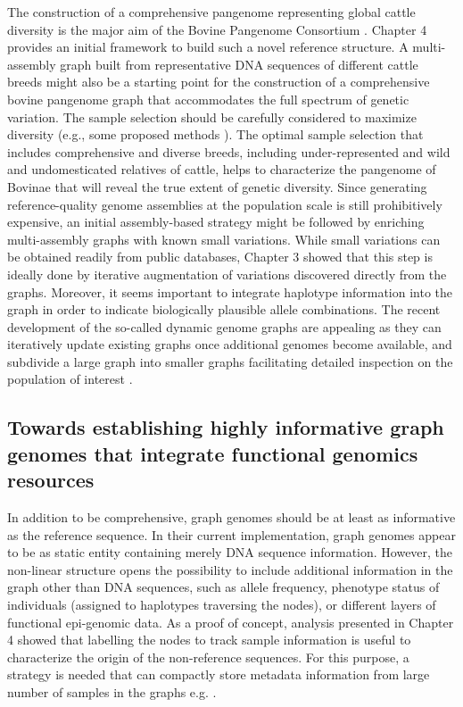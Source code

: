 \documentclass[../main.tex]{subfiles}
\begin{document}
The construction of a comprehensive pangenome representing global cattle diversity is the major aim of the Bovine Pangenome Consortium \citep{Smith2020}. Chapter 4 provides an initial framework to build such a novel reference structure. A multi-assembly graph built from representative DNA sequences of different cattle breeds might also be a starting point for the construction of a comprehensive bovine pangenome graph that accommodates the full spectrum of genetic variation. The sample selection should be carefully considered to maximize diversity (e.g., some proposed methods \citep{Ros-Freixedes2017,ranallo2021optimized}). The optimal sample selection that includes comprehensive and diverse breeds, including under-represented and wild and undomesticated relatives of cattle, helps to characterize the pangenome of Bovinae that will reveal the true extent of genetic diversity. Since generating reference-quality genome assemblies at the population scale is still prohibitively expensive, an initial assembly-based strategy might be followed by enriching multi-assembly graphs with known small variations. While small variations can be obtained readily from public databases, Chapter 3 showed that this step is ideally done by iterative augmentation of variations discovered directly from the graphs. Moreover, it seems important to integrate haplotype information into the graph in order to indicate biologically plausible allele combinations. The recent development of the so-called dynamic genome graphs are appealing as they can iteratively update existing graphs once additional genomes become available, and subdivide a large graph into smaller graphs facilitating detailed inspection on the population of interest \citep{eizenga2020efficient}.


\subsection*{Towards establishing highly informative graph genomes that integrate functional genomics resources}

In addition to be comprehensive, graph genomes should be at least as informative as the reference sequence. In their current implementation, graph genomes appear to be as static entity containing merely DNA sequence information. However, the non-linear structure opens the possibility to include additional information in the graph other than DNA sequences, such as allele frequency, phenotype status of individuals (assigned to haplotypes traversing the nodes), or different layers of functional epi-genomic data. As a proof of concept, analysis presented in Chapter 4 showed that labelling the nodes to track sample information is useful to characterize the origin of the non-reference sequences. For this purpose, a strategy is needed that can compactly store metadata information from large number of samples in the graphs e.g. \citet{siren2020haplotype}. 
\end{document}
